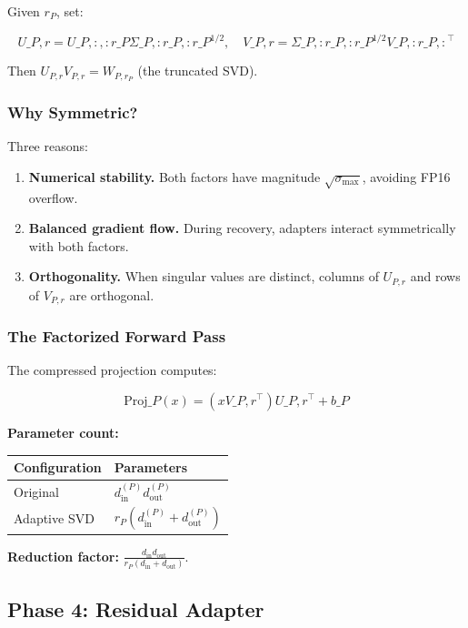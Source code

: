 Given $r_P$, set:

\[
U\_{P, r} = U\_{P, :, :r\_P} \Sigma\_{P, :r\_P, :r\_P}^{1/2}, \quad
V\_{P, r} = \Sigma\_{P, :r\_P, :r\_P}^{1/2} V\_{P, :r\_P, :}^\top
\tag{4.4}
\]

Then $U_{P, r} V_{P, r} = W_{P, r_P}$ (the truncated SVD).

\subsubsection{Why Symmetric?}

Three reasons:

\begin{enumerate}
\item \textbf{Numerical stability.} Both factors have magnitude $\sqrt{\sigma_\text{max}}$,
  avoiding FP16 overflow.

\item \textbf{Balanced gradient flow.} During recovery, adapters interact symmetrically
  with both factors.

\item \textbf{Orthogonality.} When singular values are distinct, columns of $U_{P, r}$
  and rows of $V_{P, r}$ are orthogonal.

\end{enumerate}
\subsubsection{The Factorized Forward Pass}

The compressed projection computes:

\[
\text{Proj}\_P(x) = (x V\_{P, r}^\top) U\_{P, r}^\top + b\_P
\tag{4.5}
\]

\textbf{Parameter count:}

\begin{table}[H]
\centering
\small
\begin{tabular}{ll}
\toprule
\textbf{Configuration} & \textbf{Parameters} \\
\midrule
Original & $d_\text{in}^{(P)} d_\text{out}^{(P)}$ \\
Adaptive SVD & $r_P (d_\text{in}^{(P)} + d_\text{out}^{(P)})$ \\
\bottomrule
\end{tabular}
\end{table}

\textbf{Reduction factor:} $\frac{d_\text{in} d_\text{out}}{r_P (d_\text{in} + d_\text{out})}$.

\subsection{Phase 4: Residual Adapter}


